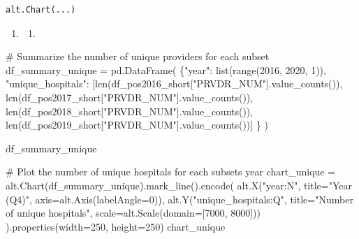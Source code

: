 \documentclass[
  letterpaper,
  DIV=11,
  numbers=noendperiod]{scrartcl}
\newenvironment{Shaded}{\begin{snugshade}}{\end{snugshade}}
\newcommand{\BuiltInTok}[1]{\textcolor[rgb]{0.00,0.23,0.31}{#1}}
\newcommand{\CommentTok}[1]{\textcolor[rgb]{0.37,0.37,0.37}{#1}}
\newcommand{\DecValTok}[1]{\textcolor[rgb]{0.68,0.00,0.00}{#1}}
\newcommand{\NormalTok}[1]{\textcolor[rgb]{0.00,0.23,0.31}{#1}}
\newcommand{\OperatorTok}[1]{\textcolor[rgb]{0.37,0.37,0.37}{#1}}
\newcommand{\StringTok}[1]{\textcolor[rgb]{0.13,0.47,0.30}{#1}}
\providecommand{\tightlist}{%
  \setlength{\itemsep}{0pt}\setlength{\parskip}{0pt}}\usepackage{longtable,booktabs,array}
\begin{document}
\begin{verbatim}
alt.Chart(...)
\end{verbatim}

\begin{enumerate}
\def\labelenumi{\arabic{enumi}.}
\setcounter{enumi}{3}
\tightlist
\item
  \begin{enumerate}
  \def\labelenumii{\alph{enumii}.}
  \tightlist
  \item
  \end{enumerate}
\end{enumerate}

\begin{Shaded}
\begin{Highlighting}[]
\CommentTok{\# Summarize the number of unique providers for each subset}
\NormalTok{df\_summary\_unique }\OperatorTok{=}\NormalTok{ pd.DataFrame(}
\NormalTok{    \{}\StringTok{"year"}\NormalTok{: }\BuiltInTok{list}\NormalTok{(}\BuiltInTok{range}\NormalTok{(}\DecValTok{2016}\NormalTok{, }\DecValTok{2020}\NormalTok{, }\DecValTok{1}\NormalTok{)),}
     \StringTok{"unique\_hospitals"}\NormalTok{:  [}\BuiltInTok{len}\NormalTok{(df\_pos2016\_short[}\StringTok{"PRVDR\_NUM"}\NormalTok{].value\_counts()), }\BuiltInTok{len}\NormalTok{(df\_pos2017\_short[}\StringTok{"PRVDR\_NUM"}\NormalTok{].value\_counts()), }\BuiltInTok{len}\NormalTok{(df\_pos2018\_short[}\StringTok{"PRVDR\_NUM"}\NormalTok{].value\_counts()), }\BuiltInTok{len}\NormalTok{(df\_pos2019\_short[}\StringTok{"PRVDR\_NUM"}\NormalTok{].value\_counts())]}
\NormalTok{     \}}
\NormalTok{)}

\NormalTok{df\_summary\_unique}

\CommentTok{\# Plot the number of unique hospitals for each subset\textquotesingle{}s year}
\NormalTok{chart\_unique }\OperatorTok{=}\NormalTok{ alt.Chart(df\_summary\_unique).mark\_line().encode(}
\NormalTok{    alt.X(}\StringTok{"year:N"}\NormalTok{, title}\OperatorTok{=}\StringTok{"Year (Q4)"}\NormalTok{, axis}\OperatorTok{=}\NormalTok{alt.Axis(labelAngle}\OperatorTok{=}\DecValTok{0}\NormalTok{)),}
\NormalTok{    alt.Y(}\StringTok{"unique\_hospitals:Q"}\NormalTok{, title}\OperatorTok{=}\StringTok{"Number of unique hospitals"}\NormalTok{,}
\NormalTok{          scale}\OperatorTok{=}\NormalTok{alt.Scale(domain}\OperatorTok{=}\NormalTok{[}\DecValTok{7000}\NormalTok{, }\DecValTok{8000}\NormalTok{]))}
\NormalTok{).properties(width}\OperatorTok{=}\DecValTok{250}\NormalTok{, height}\OperatorTok{=}\DecValTok{250}\NormalTok{)}
\NormalTok{chart\_unique}
\end{Highlighting}
\end{Shaded}
\end{document}
